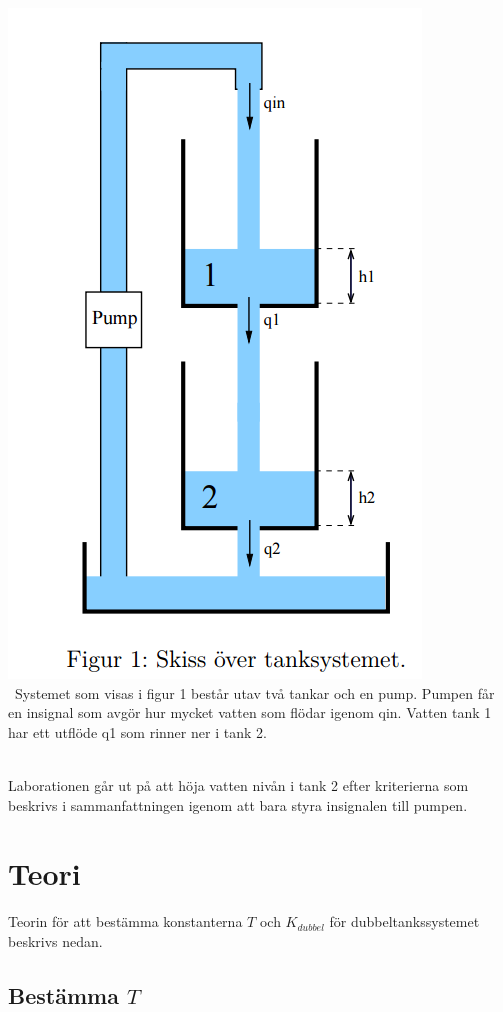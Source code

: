 \documentclass[a4paper]{article}
\begin{document}
\includegraphics[scale = 0.5]{skiss}
\\\
Systemet som visas i figur 1 består utav två tankar och en pump.
Pumpen får en insignal som avgör hur mycket vatten som flödar igenom qin. Vatten tank 1 har ett utflöde q1 som rinner ner i tank 2. \\\

Laborationen går ut på att höja vatten nivån i tank 2 efter kriterierna som beskrivs i sammanfattningen igenom att bara styra insignalen till pumpen. 

\section{Teori}

Teorin för att bestämma konstanterna $T$ och $K_{dubbel}$ för dubbeltankssystemet beskrivs nedan. 

\subsection{Bestämma $T$}
\end{document}
